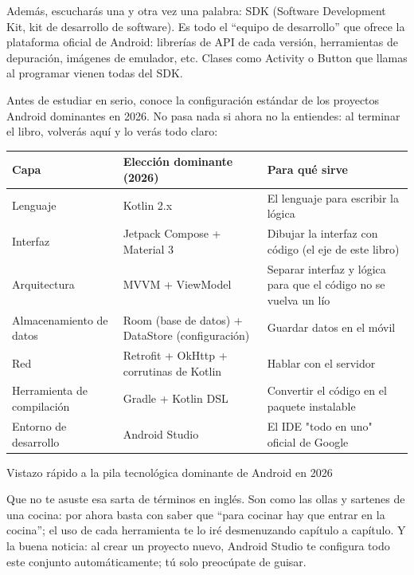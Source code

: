 Además, escucharás una y otra vez una palabra: SDK (Software Development Kit, kit de desarrollo de software). Es todo el “equipo de desarrollo” que ofrece la plataforma oficial de Android: librerías de API de cada versión, herramientas de depuración, imágenes de emulador, etc. Clases como Activity o Button que llamas al programar vienen todas del SDK.


Antes de estudiar en serio, conoce la configuración estándar de los proyectos Android dominantes en 2026. No pasa nada si ahora no la entiendes: al terminar el libro, volverás aquí y lo verás todo claro:

\begin{center}
\begin{tabularx}{\linewidth}{|X|X|X|}
\hline
\textbf{Capa} & \textbf{Elección dominante (2026)} & \textbf{Para qué sirve} \tabularnewline
\hline
Lenguaje & Kotlin 2.x & El lenguaje para escribir la lógica \tabularnewline
Interfaz & Jetpack Compose + Material 3 & Dibujar la interfaz con código (el eje de este libro) \tabularnewline
Arquitectura & MVVM + ViewModel & Separar interfaz y lógica para que el código no se vuelva un lío \tabularnewline
Almacenamiento de datos & Room (base de datos) + DataStore (configuración) & Guardar datos en el móvil \tabularnewline
Red & Retrofit + OkHttp + corrutinas de Kotlin & Hablar con el servidor \tabularnewline
Herramienta de compilación & Gradle + Kotlin DSL & Convertir el código en el paquete instalable \tabularnewline
Entorno de desarrollo & Android Studio & El IDE "todo en uno" oficial de Google \tabularnewline
\hline
\end{tabularx}
\end{center}

\begin{center}\small\color{gray}Vistazo rápido a la pila tecnológica dominante de Android en 2026\end{center}

Que no te asuste esa sarta de términos en inglés. Son como las ollas y sartenes de una cocina: por ahora basta con saber que “para cocinar hay que entrar en la cocina”; el uso de cada herramienta te lo iré desmenuzando capítulo a capítulo. Y la buena noticia: al crear un proyecto nuevo, Android Studio te configura todo este conjunto automáticamente; tú solo preocúpate de guisar.


